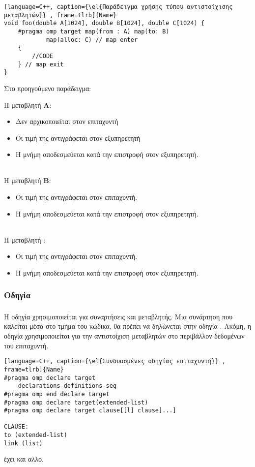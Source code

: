 \clearpage
{}
\begin{lstlisting}[language=C++, caption={\el{Παράδειγμα χρήσης τύπου αντιστοίχισης μεταβλητών}} , frame=tlrb]{Name}
void foo(double A[1024], double B[1024], double C[1024) {
	#pragma omp target map(from : A) map(to: B) 
			map(alloc: C) // map enter
	{
		//CODE
	} // map exit
}
\end{lstlisting}

Στο προηγούμενο παράδειγμα:

Η μεταβλητή \textbf{Α}:
\begin{itemize}
  \item Δεν αρχικοποιείται στον επιταχυντή
  \item Οι τιμή της αντιγράφεται στον εξυπηρετητή
  \item Η μνήμη αποδεσμεύεται κατά την επιστροφή στον εξυπηρετητή.
\end{itemize}
\ \\
Η μεταβλητή \textbf{Β}:
\begin{itemize}
  \item Οι τιμή της αντιγράφεται στον επιταχυντή.
  \item Η μνήμη αποδεσμεύεται κατά την επιστροφή στον εξυπηρετητή.
\end{itemize}
\ \\
Η μεταβλητή \textbf{}:
\begin{itemize}
  \item Οι τιμή της αντιγράφεται στον επιταχυντή.
  \item Η μνήμη αποδεσμεύεται κατά την επιστροφή στον εξυπηρετητή.
\end{itemize}

\subsubsection{Οδηγία \emph{}}
\subparagraph{}
Η οδηγία \emph{} χρησιμοποιείται για συναρτήσεις και μεταβλητής. Μια συνάρτηση που καλείται μέσα στο τμήμα του \emph{} κώδικα, θα πρέπει να δηλώνεται στην οδηγία \emph{}. Ακόμη, η οδηγία χρησιμοποιείται για την αντιστοίχιση \emph{} μεταβλητών στο περιβάλλον δεδομένων του επιταχυντή.



\begin{lstlisting}[language=C++, caption={\el{Συνδυασμένες οδηγίας επιταχυντή}} , frame=tlrb]{Name}
#pragma omp declare target
	declarations-definitions-seq
#pragma omp end declare target
#pragma omp declare target(extended-list)
#pragma omp declare target clause[[l] clause]...]

CLAUSE:
to (extended-list)
link (list)
\end{lstlisting}

\textbf{} έχει και αλλο.

